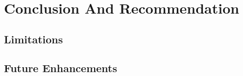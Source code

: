 \chapter{Conclusion And Recommendation}

\section{{\bf{Limitations}}}

\section{{\bf{Future Enhancements}}}

